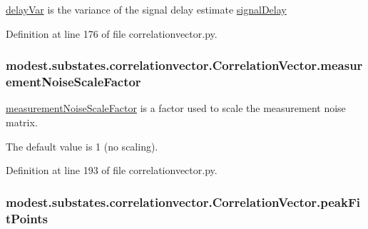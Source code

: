 \hyperlink{classmodest_1_1substates_1_1correlationvector_1_1CorrelationVector_ab0c6ffbea793ae20593e85d033341595}{delay\+Var} is the variance of the signal delay estimate \hyperlink{classmodest_1_1substates_1_1correlationvector_1_1CorrelationVector_aa1565b9972d60149f335e3b923cac371}{signal\+Delay} 



Definition at line 176 of file correlationvector.\+py.

\subsubsection[{\texorpdfstring{measurement\+Noise\+Scale\+Factor}{measurementNoiseScaleFactor}}]{\setlength{\rightskip}{0pt plus 5cm}modest.\+substates.\+correlationvector.\+Correlation\+Vector.\+measurement\+Noise\+Scale\+Factor}\hypertarget{classmodest_1_1substates_1_1correlationvector_1_1CorrelationVector_ae1c71753aea17170b58bd9fabc62c037}{}\label{classmodest_1_1substates_1_1correlationvector_1_1CorrelationVector_ae1c71753aea17170b58bd9fabc62c037}


\hyperlink{classmodest_1_1substates_1_1correlationvector_1_1CorrelationVector_ae1c71753aea17170b58bd9fabc62c037}{measurement\+Noise\+Scale\+Factor} is a factor used to scale the measurement noise matrix. 

The default value is 1 (no scaling). 

Definition at line 193 of file correlationvector.\+py.

\subsubsection[{\texorpdfstring{peak\+Fit\+Points}{peakFitPoints}}]{\setlength{\rightskip}{0pt plus 5cm}modest.\+substates.\+correlationvector.\+Correlation\+Vector.\+peak\+Fit\+Points}\hypertarget{classmodest_1_1substates_1_1correlationvector_1_1CorrelationVector_af2be8d7129fd0453208af5268fdddc22}{}\label{classmodest_1_1substates_1_1correlationvector_1_1CorrelationVector_af2be8d7129fd0453208af5268fdddc22}


